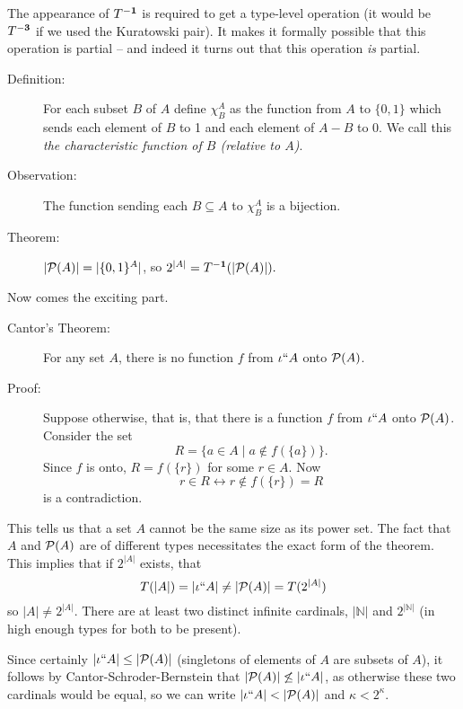 \documentclass[12pt]{book}
\begin{document}
The appearance of $T^{\bf -1}$ is required to get a type-level operation
(it would be $T^{\bf -3}$ if we used the Kuratowski pair).  It makes it
formally possible that this operation is partial -- and indeed it
turns out that this operation {\em is\/} partial.

\begin{description}

\item[Definition:] For each subset $B$ of $A$ define
$\chi^A_B$ as the function from $A$ to $\{0,1\}$ which sends each
element of $B$ to 1 and each element of $A-B$ to 0.  We call this {\em the
characteristic function of $B$ (relative to $A$)\/}.  

\item[Observation:] The function sending each $B \subseteq A$ to
$\chi^A_B$ is a bijection.

\item[Theorem:]  $|{\cal P}(A)| = |\{0,1\}^A|$, so $2^{|A|} = T^{\bf -1}(|{\cal P}(A)|).$

\end{description}

Now comes the exciting part.

\begin{description}

\item[Cantor's Theorem:]  For any set $A$, there is no function $f$
from $\iota``A$ onto ${\cal P}(A)$.

\item[Proof:] Suppose otherwise, that is, that there is a function $f$
from $\iota``A$ onto ${\cal P}(A)$.  Consider the set $$R = \{a \in
A \mid a  \not\in  f(\{a\})\}.$$ Since $f$ is onto, $R = f(\{r\})$ for some
$r \in A$.  Now $$r \in R \leftrightarrow r \not\in f(\{r\}) = R$$ is a
contradiction.

\end{description}

This tells us that a set $A$ cannot be the same size as its power set.
The fact that $A$ and ${\cal P}(A)$ are of different types
necessitates the exact form of the theorem.  This implies that if
$2^{|A|}$ exists, that $$T(|A|) =|\iota``A|\neq|{\cal
P}(A)|=T(2^{|A|})$$ so $|A| \neq 2^{|A|}$.  There are at least two
distinct infinite cardinals, $|{\mathbb N}|$ and $2^{|{\mathbb N}|}$
(in high enough types for both to be present).

Since certainly $|\iota``A| \leq |{\cal P}(A)|$ (singletons of
elements of $A$ are subsets of $A$), it follows by
Cantor-Schroder-Bernstein that $|{\cal P}(A)| \not\leq |\iota``A|$, as
otherwise these two cardinals would be equal, so we can write
$|\iota``A| < |{\cal P}(A)|$ and  $\kappa < 2^{\kappa}$.
\end{document}
